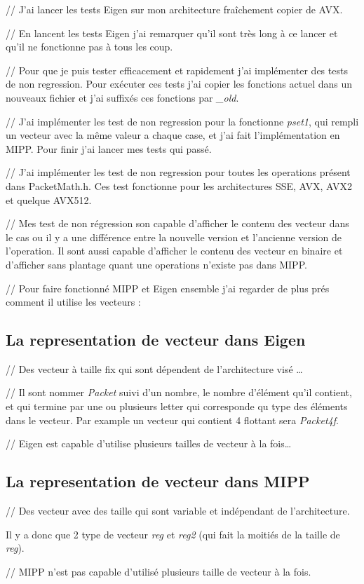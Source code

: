 // J'ai lancer les tests Eigen sur mon architecture fraîchement copier de AVX.

// En lancent les tests Eigen j'ai remarquer qu'il sont très long à ce lancer et qu'il
ne fonctionne pas à tous les coup.

// Pour que je puis tester efficacement et rapidement j'ai implémenter des tests de non
regression. Pour exécuter ces tests j'ai copier les fonctions actuel dans un nouveaux
fichier et j'ai suffixés ces fonctions par \emph{\_old}.

// J'ai implémenter les test de non regression pour la fonctionne \emph{pset1}, qui
rempli un vecteur avec la même valeur a chaque case, et j'ai fait l'implémentation en
MIPP. Pour finir j'ai lancer mes tests qui passé.

// J'ai implémenter les test de non regression pour toutes les operations présent dans
PacketMath.h. Ces test fonctionne pour les architectures SSE, AVX, AVX2 et quelque AVX512.

// Mes test de non régression son capable d'afficher le contenu des vecteur dans le cas
ou il y a une différence entre la nouvelle version et l'ancienne version de l'operation.
Il sont aussi capable d'afficher le contenu des vecteur en binaire et d'afficher sans
plantage quant une operations n'existe pas dans MIPP.

// Pour faire fonctionné MIPP et Eigen ensemble j'ai regarder de plus prés comment il
utilise les vecteurs :

\subsection{La representation de vecteur dans Eigen}
{
  // Des vecteur à taille fix qui sont dépendent de l'architecture visé \dots

  // Il sont nommer \emph{Packet} suivi d'un nombre, le nombre d'élément qu'il contient,
  et qui termine par une ou plusieurs letter qui corresponde qu type des éléments dans
  le vecteur. Par example un vecteur qui contient 4 flottant sera \emph{Packet4f}.

  // Eigen est capable d'utilise plusieurs tailles de vecteur à la fois\dots
}

\subsection{La representation de vecteur dans MIPP}
{
  // Des vecteur avec des taille qui sont variable et indépendant de l'architecture.

  Il y a donc que 2 type de vecteur \emph{reg} et \emph{reg2} (qui fait la moitiés de la
  taille de \emph{reg}).

  // MIPP n'est pas capable d'utilisé plusieurs taille de vecteur à la fois.
}

